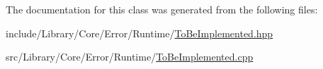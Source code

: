 The documentation for this class was generated from the following files\+:\begin{DoxyCompactItemize}
\item 
include/\+Library/\+Core/\+Error/\+Runtime/\hyperlink{_to_be_implemented_8hpp}{To\+Be\+Implemented.\+hpp}\item 
src/\+Library/\+Core/\+Error/\+Runtime/\hyperlink{_to_be_implemented_8cpp}{To\+Be\+Implemented.\+cpp}\end{DoxyCompactItemize}
